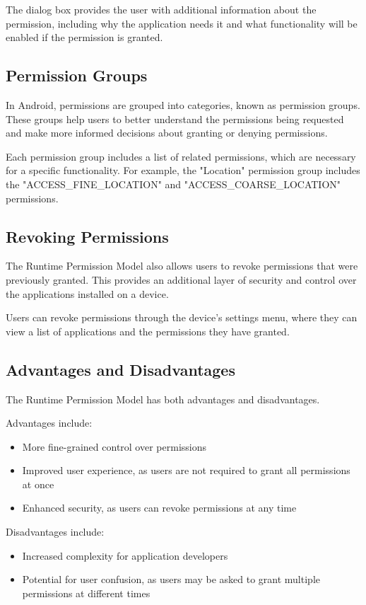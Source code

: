 \documentclass{article}
\begin{document}
The dialog box provides the user with additional information about the permission, including why the application needs it and what functionality will be enabled if the permission is granted.

\subsection{Permission Groups}
In Android, permissions are grouped into categories, known as permission groups. These groups help users to better understand the permissions being requested and make more informed decisions about granting or denying permissions.

Each permission group includes a list of related permissions, which are necessary for a specific functionality. For example, the "Location" permission group includes the "ACCESS\_FINE\_LOCATION" and "ACCESS\_COARSE\_LOCATION" permissions.

\subsection{Revoking Permissions}

The Runtime Permission Model also allows users to revoke permissions that were previously granted. This provides an additional layer of security and control over the applications installed on a device.

Users can revoke permissions through the device's settings menu, where they can view a list of applications and the permissions they have granted.
\subsection{Advantages and Disadvantages}

The Runtime Permission Model has both advantages and disadvantages.

Advantages include:

\begin{itemize}
\item More fine-grained control over permissions
\item Improved user experience, as users are not required to grant all permissions at once
\item Enhanced security, as users can revoke permissions at any time
\end{itemize}

Disadvantages include:

\begin{itemize}
\item Increased complexity for application developers
\item Potential for user confusion, as users may be asked to grant multiple permissions at different times
\end{itemize}
\end{document}
